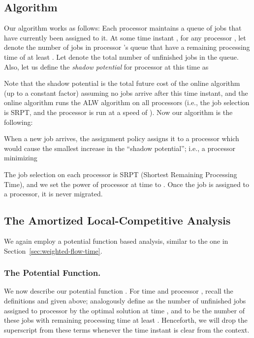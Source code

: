 \documentclass[11pt]{article}
\newcommand{\alw}{{\sf ALW}\xspace}
\begin{document}
\subsection{Algorithm}
\label{dsec:algorithm-uf}

Our algorithm works as follows: Each processor maintains a queue of jobs
that have currently been assigned to it.  At some time instant , for
any processor , let  denote the number of jobs in processor
's queue that have a remaining processing time of at least . Let
 denote the total number of unfinished jobs in the queue. Also,
let us define the \emph{shadow potential} for processor  at this time
 as

Note that the shadow potential
 is the total future cost of the online
algorithm (up to a constant factor) assuming no jobs arrive after this
time instant, and the online algorithm runs the \alw algorithm on all
processors (i.e., the job selection is SRPT, and the processor is run at
a speed of ). Now our algorithm is the following:
\begin{shadebox}
  \noindent When a new job arrives, the assignment policy assigns it to a
  processor which would cause the smallest increase in the ``shadow
  potential''; i.e., a processor minimizing
  
  The job selection on each processor is SRPT (Shortest Remaining
  Processing Time), and we set the power of processor  at time  to .  Once the job is
  assigned to a processor, it is never migrated.
\end{shadebox}



\subsection{The Amortized Local-Competitive Analysis}
\label{dsec:analysis-uf}

We again employ a potential function based analysis, similar to the one in Section~\ref{sec:weighted-flow-time}.


\subsubsection{The Potential Function.}

We now describe our potential function .  For time  and
processor , recall the definitions  and  given above;
analogously define  as the number of unfinished jobs assigned
to processor  by the optimal solution at time , and  to be the
number of these jobs with remaining processing time at least .
Henceforth, we will drop the superscript  from these terms whenever the time instant  is clear from the context.
\end{document}
